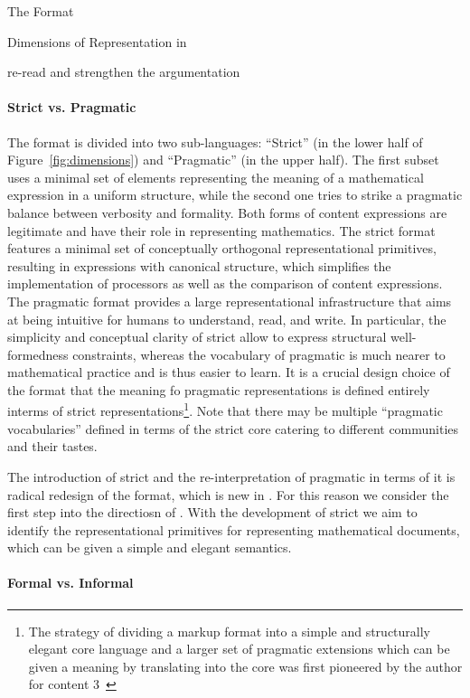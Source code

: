 \begin{omgroup}[creators=miko,id=spec-intro]{The \omdoc Format}
\begin{omgroup}[id=syntax-semantics]{Dimensions of Representation in \omdoc}
\begin{newpart}{re-read and strengthen the argumentation}
\paragraph{Strict vs. Pragmatic} The \omdoc format is divided into two sub-languages:
``Strict'' \omdoc (in the lower half of Figure~\ref{fig:dimensions}) and ``Pragmatic''
\omdoc (in the upper half). The first subset uses a minimal set of elements representing the meaning of a
mathematical expression in a uniform structure, while the second one tries to strike a
pragmatic balance between verbosity and formality. Both forms of content expressions are
legitimate and have their role in representing mathematics. The strict \omdoc format
features a minimal set of conceptually orthogonal representational primitives, resulting
in expressions with canonical structure, which simplifies the implementation of \omdoc
processors as well as the comparison of content expressions.  The pragmatic \omdoc
format provides a large representational infrastructure that aims at being intuitive for
humans to understand, read, and write. In particular, the simplicity and conceptual clarity of strict \omdoc allow to
express structural well-formedness constraints, whereas the vocabulary of pragmatic \omdoc
is much nearer to mathematical practice and is thus easier to learn. It is a crucial
design choice of the \omdoc format that the meaning fo pragmatic representations is
defined entirely interms of strict representations\footnote{The strategy of dividing a
  markup format into a simple and structurally elegant core language and a larger set of
  pragmatic extensions which can be given a meaning by translating into the core was first
  pioneered by the author for content {\mathml}3~\cite{CarlisleEd:MathML3}}. Note that
there may be multiple ``pragmatic vocabularies'' defined in terms of the strict core
catering to different communities and their tastes.

The introduction of strict \omdoc and the re-interpretation of pragmatic \omdoc in
terms of it is radical redesign of the \omdoc format, which is new in {}.
For this reason we consider {} the first step into the directiosn of
{}. With the development of strict \omdoc we aim to identify the
representational primitives for representing mathematical documents, which can be given a
simple and elegant semantics.

\paragraph{Formal vs. Informal} 


\end{newpart}
\end{omgroup}
\end{omgroup}
